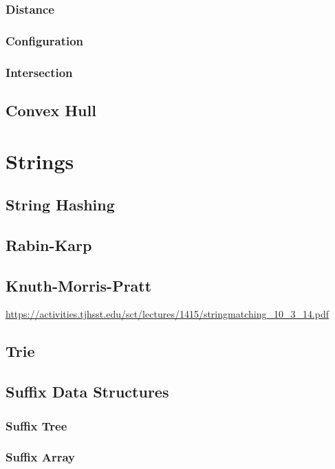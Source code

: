 \documentclass[11pt]{book}
\begin{document}
\subsection{Distance}

\subsection{Configuration}

\subsection{Intersection}

\section{Convex Hull}

\chapter{Strings}

\section{String Hashing}

\section{Rabin-Karp}

\section{Knuth-Morris-Pratt}

\url{https://activities.tjhsst.edu/sct/lectures/1415/stringmatching_10_3_14.pdf}

\section{Trie}

\section{Suffix Data Structures}

\subsection{Suffix Tree}

\subsection{Suffix Array}
\end{document}
